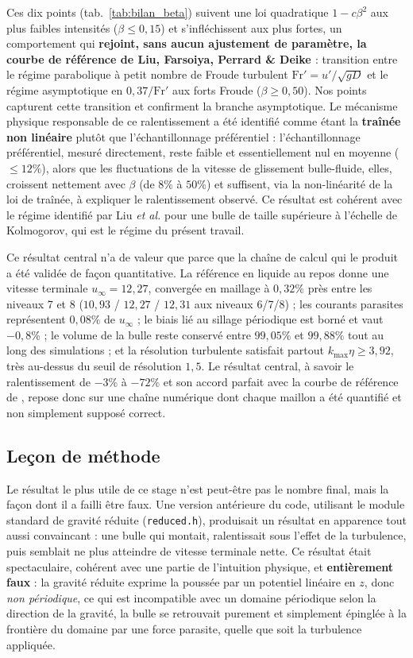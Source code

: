 Ces dix points (tab.~\ref{tab:bilan_beta}) suivent une loi quadratique
$1-c\beta^2$ aux plus faibles intensités ($\beta \le 0{,}15$) et s'infléchissent aux plus fortes, un
comportement qui \textbf{rejoint, sans aucun ajustement de paramètre, la courbe
de référence de Liu, Farsoiya, Perrard \& Deike \cite{liu2024}} : transition entre le
régime parabolique à petit nombre de Froude turbulent $\mathrm{Fr}'=u'/\sqrt{gD}$
et le régime asymptotique en $0{,}37/\mathrm{Fr}'$ aux forts Froude ($\beta \ge 0{,}50$). Nos points capturent
cette transition et confirment la branche asymptotique. Le mécanisme
physique responsable de ce ralentissement a été identifié comme étant la
\textbf{traînée non linéaire} plutôt que l'échantillonnage préférentiel :
l'échantillonnage préférentiel, mesuré directement, reste faible et
essentiellement nul en moyenne ($\le12\%$), alors que les fluctuations de la
vitesse de glissement bulle-fluide, elles, croissent nettement avec $\beta$ (de
$8\%$ à $50\%$) et suffisent, via la non-linéarité de la loi de traînée, à
expliquer le ralentissement observé. Ce résultat est cohérent avec le régime
identifié par Liu \emph{et al.} \cite{liu2024} pour une bulle de taille
supérieure à l'échelle de Kolmogorov, qui est le régime du présent
travail.

Ce résultat central n'a de valeur que parce que la chaîne de calcul qui le
produit a été validée de façon quantitative. La référence en liquide au repos
donne une vitesse terminale $u_\infty=12{,}27$, convergée en maillage à
$0{,}32\%$ près entre les niveaux 7 et 8 ($10{,}93$ / $12{,}27$ / $12{,}31$ aux
niveaux 6/7/8) ; les courants parasites représentent $0{,}08\%$ de $u_\infty$ ;
le biais lié au sillage périodique est borné et vaut $-0{,}8\%$ ; le volume de la
bulle reste conservé entre $99{,}05\%$ et $99{,}88\%$ tout au long des
simulations ; et la résolution turbulente satisfait partout $k_{\max}\eta\ge3{,}92$,
très au-dessus du seuil de résolution $1{,}5$. Le résultat central, à savoir le
ralentissement de $-3\%$ à $-72\%$ et son accord parfait avec la courbe de référence de
\cite{liu2024}, repose donc sur une chaîne numérique dont chaque maillon a été
quantifié et non simplement supposé correct.

\subsection{Leçon de méthode}

Le résultat le plus utile de ce stage n'est peut-être pas le nombre final, mais
la façon dont il a failli être faux. Une version antérieure du code, utilisant le
module standard de gravité réduite (\texttt{reduced.h}), produisait un résultat
en apparence tout aussi convaincant : une bulle qui montait, ralentissait sous
l'effet de la turbulence, puis semblait ne plus atteindre de vitesse terminale
nette. Ce résultat était spectaculaire, cohérent avec une partie de
l'intuition physique, et \textbf{entièrement faux} : la gravité réduite exprime
la poussée par un potentiel linéaire en $z$, donc \emph{non périodique}, ce qui
est incompatible avec un domaine périodique selon la direction de la gravité,
la bulle se retrouvait purement et simplement épinglée à la frontière du
domaine par une force parasite, quelle que soit la turbulence appliquée.

